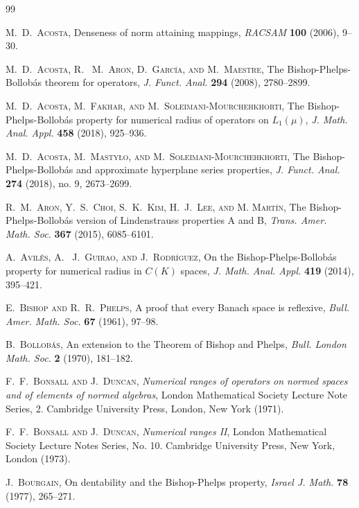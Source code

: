 \documentclass[10pt,a4paper]{amsart}
\theoremstyle{plain}
\theoremstyle{definition}
\begin{document}
\begin{thebibliography}{99}
	
\textsc{M.~D.~Acosta},
Denseness of norm attaining mappings, \emph{RACSAM} {\bf 100} (2006), 9--30.

 \textsc{M.~D.~Acosta, R.~ M.~Aron, D.~Garc\'ia, and M.~Maestre}, The Bishop-Phelps-Bollob\'as theorem for operators, \emph{J. Funct. Anal.} {\bf 294} (2008), 2780--2899.

 \textsc{M.~D.~Acosta, M.~Fakhar, and M.~Soleimani-Mourchehkhorti}, The Bishop-Phelps-Bollob\'{a}s property for numerical radius of operators on $L_1(\mu)$, \emph{J. Math. Anal. Appl.} \textbf{458} (2018), 925--936.

 \textsc{M.~D.~Acosta, M.~Masty{\l}o, and M.~Soleimani-Mourchehkhorti}, The Bishop-Phelps-Bollob\'as and approximate hyperplane series properties, \emph{J. Funct. Anal.} \textbf{274} (2018), no. 9, 2673--2699.
	
 \textsc{R.~M.~Aron, Y.~S.~Choi, S.~K.~Kim, H.~J.~Lee, and M. Mart\'in}, The Bishop-Phelps-Bollob\'{a}s version of Lindenstrauss properties A and B, \emph{Trans. Amer. Math. Soc.} {\bf 367} (2015), 6085--6101.

 \textsc{A.~Avil\'es, A.~ J.~Guirao, and J.~Rodr\'iguez}, On the Bishop-Phelps-Bollob\'as property for numerical radius in $C(K)$ spaces, \emph{J. Math. Anal. Appl.} {\bf 419} (2014), 395--421.
	
 \textsc{E.~Bishop and R.~R.~Phelps}, A proof that every Banach space is reflexive, \emph{Bull. Amer. Math. Soc.} {\bf 67} (1961), 97--98.
	
\textsc{B.~Bollob\'{a}s}, An extension to the Theorem of Bishop and Phelps, \emph{Bull. London Math. Soc.} {\bf 2} (1970), 181--182.

 \textsc{F.~F.~Bonsall and J.~Duncan}, \emph{Numerical ranges of operators on normed spaces and of elements of normed algebras}, London Mathematical Society Lecture Note Series, 2. Cambridge University Press, London, New York (1971).

 \textsc{F.~F.~Bonsall and J.~Duncan}, \emph{Numerical ranges II}, London Mathematical Society Lecture Notes Series, No. 10.
Cambridge University Press, New York, London (1973). 

 \textsc{J.~Bourgain}, On dentability and the Bishop-Phelps property, \emph{Israel J. Math.} \textbf{78} (1977), 265--271.


\end{thebibliography}
\end{document}
